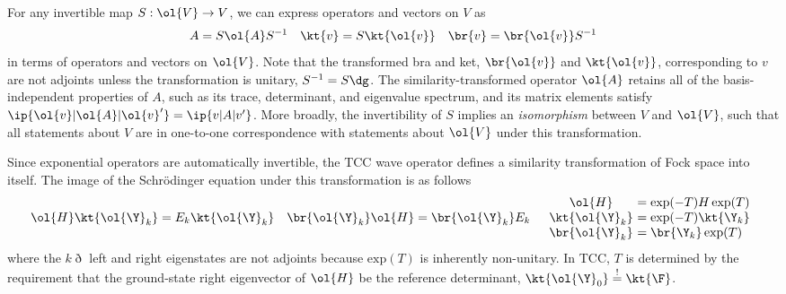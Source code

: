 \begin{dfn}
For any invertible map $S:\ol{V}\rightarrow V$, we can express operators and vectors on $V$ as
\begin{align}
  A
=
  S
  \ol{A}
  S^{-1}
&&
  \kt{v}
=
  S
  \kt{\ol{v}}
&&
  \br{v}
=
  \br{\ol{v}}
  S^{-1}
\end{align}
in terms of operators and vectors on $\ol{V}$.
Note that the transformed bra and ket, $\br{\ol{v}}$ and $\kt{\ol{v}}$, corresponding to $v$ are not adjoints unless the transformation is unitary, $S^{-1}=S\dg$.
The similarity-transformed operator $\ol{A}$ retains all of the basis-independent properties of $A$, such as its trace, determinant, and eigenvalue spectrum, and its matrix elements satisfy $\ip{\ol{v}|\ol{A}|\ol{v}'}=\ip{v|A|v'}$.
More broadly, the invertibility of $S$ implies an \textit{isomorphism} between $V$ and $\ol{V}$, such that all statements about $V$ are in one-to-one correspondence with statements about $\ol{V}$ under this transformation.
\end{dfn}


\begin{rmk}
Since exponential operators are automatically invertible, the TCC wave operator defines a similarity transformation of Fock space into itself.
The image of the Schr\"odinger equation under this transformation is as follows
\begin{align}
\label{eq:similarity-transformed-schrodinger-equation}
  \ol{H}
  \kt{\ol{\Y}_k}
=
  E_k
  \kt{\ol{\Y}_k}
&&
  \br{\ol{\Y}_k}
  \ol{H}
=
  \br{\ol{\Y}_k}
  E_k
&&
\begin{array}{c@{\ }l}
  \ol{H}
&=
  \text{exp}(-T)
  H\,
  \text{exp}(T)
\\
  \kt{\ol{\Y}_k}
&=
  \text{exp}(-T)
  \kt{\Y_k}
\\
  \br{\ol{\Y}_k}
&=
  \br{\Y_k}\,
  \text{exp}(T)
\end{array}
\end{align}
where the $k\eth$ left and right eigenstates are not adjoints because $\text{exp}(T)$ is inherently non-unitary.
In TCC, $T$ is determined by the requirement that the ground-state right eigenvector of $\ol{H}$ be the reference determinant,
$
  \kt{\ol{\Y}_0}
\overset{!}{=}
  \kt{\F}
$.
\end{rmk}


